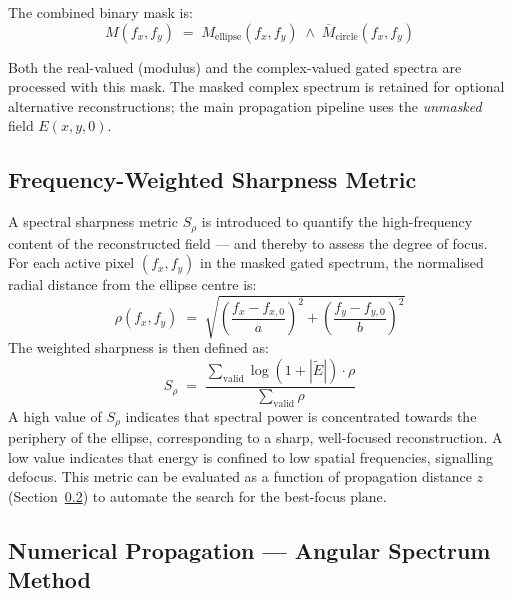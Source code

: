 The combined binary mask is:
\begin{equation}
    M(f_x,f_y)
    \;=\;
    M_\text{ellipse}(f_x,f_y)
    \;\wedge\;
    \overline{M}_\text{circle}(f_x,f_y)
    \label{eq:combined_mask}
\end{equation}

Both the real-valued (modulus) and the complex-valued gated spectra are
processed with this mask.
The masked complex spectrum is retained for optional alternative
reconstructions; the main propagation pipeline uses the \textit{unmasked}
field $E(x,y,0)$.

\subsection{Frequency-Weighted Sharpness Metric}

A spectral sharpness metric $S_\rho$ is introduced to quantify the
high-frequency content of the reconstructed field — and thereby to assess
the degree of focus.
For each active pixel $(f_x,f_y)$ in the masked gated spectrum, the
normalised radial distance from the ellipse centre is:
\begin{equation}
    \rho(f_x,f_y)
    \;=\; \sqrt{\left(\frac{f_x - f_{x,0}}{a}\right)^2
               +\left(\frac{f_y - f_{y,0}}{b}\right)^2}
\end{equation}
The weighted sharpness is then defined as:
\begin{equation}
    S_\rho
    \;=\;
    \frac{\displaystyle\sum_{\text{valid}}
          \log\!\left(1+|\tilde{E}|\right)\cdot\rho}
         {\displaystyle\sum_{\text{valid}}\rho}
    \label{eq:sharpness}
\end{equation}
A high value of $S_\rho$ indicates that spectral power is concentrated
towards the periphery of the ellipse, corresponding to a sharp, well-focused
reconstruction.
A low value indicates that energy is confined to low spatial frequencies,
signalling defocus.
This metric can be evaluated as a function of propagation distance $z$
(Section~\ref{sec:propagation}) to automate the search for the best-focus
plane.

\subsection{Numerical Propagation — Angular Spectrum Method}
\label{sec:propagation}

